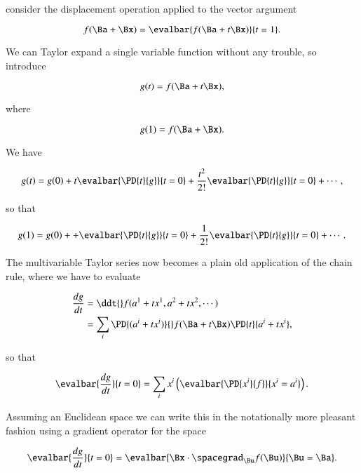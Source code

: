 consider the displacement operation applied to the vector argument

\begin{equation}\label{eqn:qmTwoL6:230}
f(\Ba + \Bx) = \evalbar{f(\Ba + t \Bx)}{t=1}.
\end{equation}

We can Taylor expand a single variable function without any trouble, so introduce

\begin{equation}\label{eqn:qmTwoL6:250}
g(t) = f(\Ba + t \Bx),
\end{equation}

where

\begin{equation}\label{eqn:qmTwoL6:270}
g(1) = f(\Ba + \Bx).
\end{equation}

We have 

\begin{equation}\label{eqn:qmTwoL6:290}
g(t) = g(0) 
+ t \evalbar{ \PD{t}{g} }{t = 0}
+ \frac{t^2}{2!} \evalbar{ \PD{t}{g} }{t = 0}
+ \cdots,
\end{equation}

so that

\begin{equation}\label{eqn:qmTwoL6:310}
g(1) = g(0) + 
+ \evalbar{ \PD{t}{g} }{t = 0}
+ \frac{1}{2!} \evalbar{ \PD{t}{g} }{t = 0}
+ \cdots.
\end{equation}

The multivariable Taylor series now becomes a plain old application of the chain rule, where we have to evaluate

\begin{align*}
\frac{dg}{dt} 
&= \ddt{} f(a^1 + t x^1, a^2 + t x^2, \cdots) \\
&= \sum_i \PD{(a^i + t x^i)}{} f(\Ba + t \Bx) \PD{t}{a^i + t x^i},
\end{align*}

so that

\begin{equation}\label{eqn:qmTwoL6:330}
\evalbar{\frac{dg}{dt} }{t=0}
= \sum_i x^i \left( 
\evalbar{ \PD{x^i}{f}}{x^i = a^i}
\right).
\end{equation}

Assuming an Euclidean space we can write this in the notationally more pleasant fashion using a gradient operator for the space

\begin{equation}\label{eqn:qmTwoL6:350}
\evalbar{\frac{dg}{dt} }{t=0} = \evalbar{\Bx \cdot \spacegrad_{\Bu} f(\Bu)}{\Bu = \Ba}.
\end{equation}

